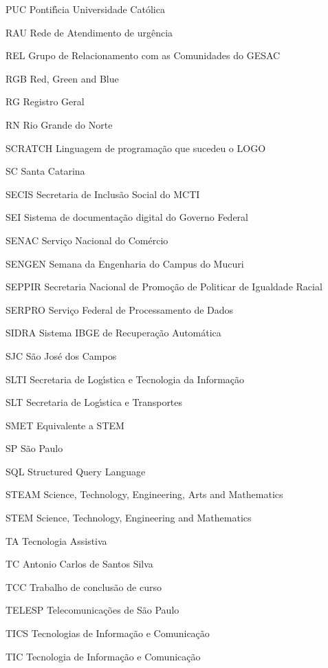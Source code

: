 \begin{siglas}
\item[PUC] Pontif\'{\i}cia Universidade Cat\'olica
\item[RAU] Rede de Atendimento de urg\^encia
\item[REL] Grupo de Relacionamento com as Comunidades do GESAC
\item[RGB] Red, Green and Blue
\item[RG] Registro Geral
\item[RN] Rio Grande do Norte
\item[SCRATCH] Linguagem de programa\c{c}\~ao que sucedeu o LOGO
\item[SC] Santa Catarina
\item[SECIS] Secretaria de Inclus\~ao Social do MCTI
\item[SEI] Sistema de documenta\c{c}\~ao digital do Governo Federal
\item[SENAC] Servi\c{c}o Nacional do Com\'ercio
\item[SENGEN]  Semana da Engenharia do Campus do Mucuri
\item[SEPPIR] Secretaria Nacional de Promo\c{c}\~ao de Politicar de Igualdade Racial
\item[SERPRO] Servi\c{c}o Federal de Processamento de Dados
\item[SIDRA] Sistema IBGE de Recupera\c{c}\~ao Autom\'atica
\item[SJC] S\~ao Jos\'e dos Campos
\item[SLTI]  Secretaria de Log\'{\i}stica e Tecnologia da Informa\c{c}\~ao 
\item[SLT]  Secretaria de Log\'{\i}stica e Transportes
\item[SMET] Equivalente a STEM
\item[SP] S\~ao Paulo
\item[SQL] Structured Query Language
\item[STEAM] Science, Technology, Engineering, Arts and Mathematics
\item[STEM]  Science, Technology, Engineering and Mathematics
\item[TA] Tecnologia Assistiva
\item[TC] Antonio Carlos de Santos Silva
\item[TCC] Trabalho de conclus\~ao de curso
\item[TELESP] Telecomunica\c{c}\~oes de S\~ao Paulo
\item[TICS] Tecnologias de Informa\c{c}\~ao e Comunica\c{c}\~ao
\item[TIC] Tecnologia de Informa\c{c}\~ao e Comunica\c{c}\~ao

\end{siglas}
